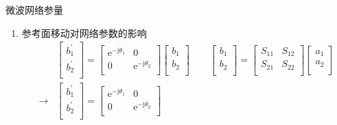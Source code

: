 \begin{frame}{微波网络参量}
    \begin{enumerate}
        \resume
        \item 参考面移动对网络参数的影响\\
        \begin{align*}
            &\begin{bmatrix*}
                b_1^{'} \\
                b_2^{'} \\
            \end{bmatrix*}
            =
            \begin{bmatrix*}
                \mathrm{e}^{-\mathrm{j}\theta_1} & 0 \\
                0 & \mathrm{e}^{-\mathrm{j}\theta_2} \\
            \end{bmatrix*}
            \begin{bmatrix*}
                b_1 \\
                b_2 \\
            \end{bmatrix*}
            \qquad
            \begin{bmatrix*}
                b_1 \\
                b_2 \\
            \end{bmatrix*}
            =
            \begin{bmatrix*}
                S_{11} & S_{12} \\
                S_{21} & S_{22} \\
            \end{bmatrix*}
            \begin{bmatrix*}
                a_1 \\
                a_2 \\
            \end{bmatrix*}\\
            \rightarrow
            &\begin{bmatrix*}
                b_1^{'} \\
                b_2^{'} \\
            \end{bmatrix*}
            =
            \begin{bmatrix*}
                \mathrm{e}^{-\mathrm{j}\theta_1} & 0 \\
                0 & \mathrm{e}^{-\mathrm{j}\theta_2} \\

\end{bmatrix*}
\end{align*}
\end{enumerate}
\end{frame}
